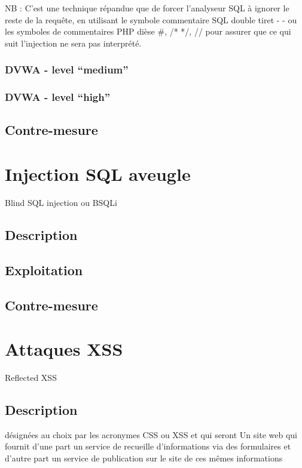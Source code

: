 NB : C'est une technique répandue que de forcer l'analyseur SQL à ignorer le reste de la requête, en utilisant le symbole commentaire SQL double tiret - - ou les symboles de commentaires PHP dièse \#, {/* */}, {//} pour assurer que ce qui suit l'injection ne sera pas interprété.  






\subsubsection{DVWA - level “medium”}


\subsubsection{DVWA - level “high”}

\subsection{Contre-mesure}


\section{Injection SQL aveugle}
Blind SQL injection ou BSQLi
\subsection{Description}

\subsection{Exploitation}

\subsection{Contre-mesure}


\section{Attaques XSS }Reflected XSS

\subsection{Description}
 désignées au choix par les acronymes CSS ou XSS et qui seront
Un site web qui fournit d'une part un service de recueille d'informations via des formulaires et d'autre part un service de publication sur le site de ces mêmes informations

